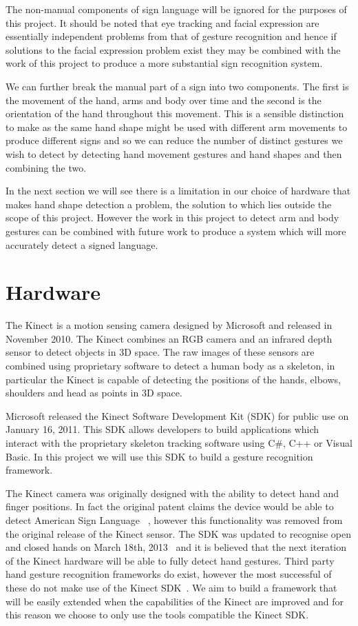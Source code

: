 The non-manual components of sign language will be ignored for the purposes of this project. It should be noted that eye tracking and facial expression are essentially independent problems from that of gesture recognition and hence if solutions to the facial expression problem exist they may be combined with the work of this project to produce a more substantial sign recognition system.

We can further break the manual part of a sign into two components. The first is the movement of the hand, arms and body over time and the second is the orientation of the hand throughout this movement. This is a sensible distinction to make as the same hand shape might be used with different arm movements to produce different signs and so we can reduce the number of distinct gestures we wish to detect by detecting hand movement gestures and hand shapes and then combining the two.

In the next section we will see there is a limitation in our choice of hardware that makes hand shape detection a problem, the solution to which lies outside the scope of this project. However the work in this project to detect arm and body gestures can be combined with future work to produce a system which will more accurately detect a signed language. 

\section{Hardware}
The Kinect is a motion sensing camera designed by Microsoft and released in November 2010. The Kinect combines an RGB camera and an infrared depth sensor to detect objects in 3D space. The raw images of these sensors are combined using proprietary software to detect a human body as a skeleton, in particular the Kinect is capable of detecting the positions of the hands, elbows, shoulders and head as points in 3D space.

Microsoft released the Kinect Software Development Kit (SDK) for public use on January 16, 2011. This SDK allows developers to build applications which interact with the proprietary skeleton tracking software using C\#, C++ or Visual Basic. In this project we will use this SDK to build a gesture recognition framework.

The Kinect camera was originally designed with the ability to detect hand and finger positions. In fact the original patent claims the device would be able to detect American Sign Language ~\citep{LATTA:2010:biblatex}, however this functionality was removed from the original release of the Kinect sensor. The SDK was updated to recognise open and closed hands on March 18th, 2013~\citep{Microsoft:2013:Online} and it is believed that the next iteration of the Kinect hardware will be able to fully detect hand gestures. Third party hand gesture recognition frameworks do exist, however the most successful of these do not make use of the Kinect SDK~\citep{Forth:2013:Online}. We aim to build a framework that will be easily extended when the capabilities of the Kinect are improved and for this reason we choose to only use the tools compatible the Kinect SDK.

